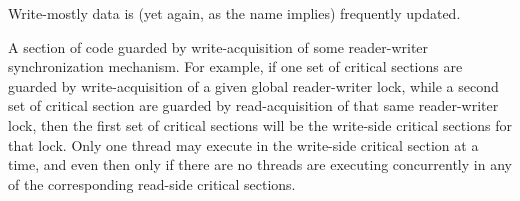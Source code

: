 \begin{description}
	Write-mostly data is (yet again, as the name implies) frequently
	updated.
\item[\IXGh{Write-Side}{Critical Section}:]
	A section of code guarded by write-acquisition of
	some reader-writer synchronization mechanism.
	For example, if one set of critical sections are guarded by
	write-acquisition of
	a given global reader-writer lock, while a second set of critical
	section are guarded by read-acquisition of that same reader-writer
	lock, then the first set of critical sections will be the
	write-side critical sections for that lock.
	Only one thread may execute in the write-side critical section
	at a time, and even then only if there are no threads are
	executing concurrently in any of the corresponding read-side
	critical sections.
\end{description}
